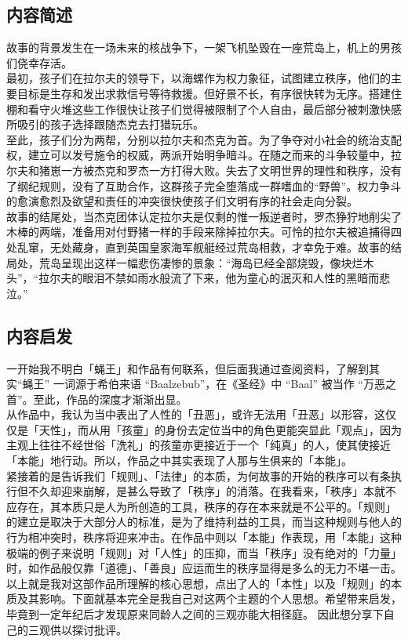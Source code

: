 \documentclass[supercite]{Experimental_Report}
\theoremstyle{definition}
\begin{document}
	\subsection{内容简述}
	故事的背景发生在一场未来的核战争下，一架飞机坠毁在一座荒岛上，机上的男孩们侥幸存活。
	\\最初，孩子们在拉尔夫的领导下，以海螺作为权力象征，试图建立秩序，他们的主要目标是生存和发出求救信号等待救援。但好景不长，有序很快转为无序。搭建住棚和看守火堆这些工作很快让孩子们觉得被限制了个人自由，最后部分被刺激快感所吸引的孩子选择跟随杰克去打猎玩乐。
	\\	至此，孩子们分为两帮，分别以拉尔夫和杰克为首。为了争夺对小社会的统治支配权，建立可以发号施令的权威，两派开始明争暗斗。在随之而来的斗争较量中，拉尔夫和猪崽一方被杰克和罗杰一方打得大败。失去了文明世界的理性和秩序，没有了纲纪规则，没有了互助合作，这群孩子完全堕落成一群嗜血的“野兽”。权力争斗的愈演愈烈及欲望和责任的冲突很快使孩子们文明有序的社会走向分裂。
	\\	故事的结尾处，当杰克团体认定拉尔夫是仅剩的惟一叛逆者时，罗杰狰狞地削尖了木棒的两端，准备用对付野猪一样的手段来除掉拉尔夫。可怜的拉尔夫被追捕得四处乱窜，无处藏身，直到英国皇家海军舰艇经过荒岛相救，才幸免于难。故事的结局处，荒岛呈现出这样一幅悲伤凄惨的景象：“海岛已经全部烧毁，像块烂木头”，“拉尔夫的眼泪不禁如雨水般流了下来，他为童心的泯灭和人性的黑暗而悲泣。”
	
	
	
	
	\subsection{内容启发}
	一开始我不明白「蝇王」和作品有何联系，但后面我通过查阅资料，了解到其实“蝇王” 一词源于希伯来语 “Baalzebub”，在《圣经》中 “Baal” 被当作 “万恶之首”。至此，作品的深度才渐渐出显。
	\\从作品中，我认为当中表出了人性的「丑恶」，或许无法用「丑恶」以形容，这仅仅是「天性」，而从用「孩童」的身份去定位当中的角色更能突显此「观点」，因为主观上往往不经世俗「洗礼」的孩童亦更接近于一个「纯真」的人，使其使接近「本能」地行动。所以，作品之中其实表现了人那与生俱来的「本能」。
	\\紧接着的是告诉我们「规则」、「法律」的本质，为何故事的开始的秩序可以有条执行但不久却迎来崩解，是甚么导致了「秩序」的消落。在我看来，「秩序」本就不应存在，其本质只是人为所创造的工具，秩序的存在本来就是不公平的。「规则」的建立是取决于大部分人的标准，是为了维持利益的工具，而当这种规则与他人的行为相冲突时，秩序将迎来冲击。在作品中则以「本能」作表现，用「本能」这种极端的例子来说明「规则」对「人性」的压抑，而当「秩序」没有绝对的「力量」时，如作品般仅靠「道德」、「善良」应运而生的秩序显得是多么的无力不堪一击。
	\\以上就是我对这部作品所理解的核心思想，点出了人的「本性」以及「规则」的本质及其影响。下面就基本完全是我自己对这两个主题的个人思想。希望带来启发，毕竟到一定年纪后才发现原来同龄人之间的三观亦能大相径庭。
	因此想分享下自己的三观供以探讨批评。
	
\end{document}
